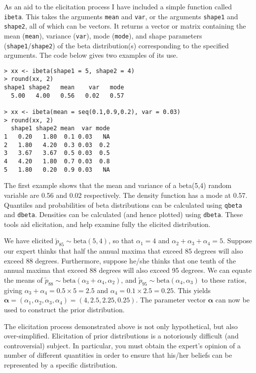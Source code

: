 \documentclass[11pt,a4paper]{article}
\newcommand{\bs}{\boldsymbol}
\begin{document}
As an aid to the elicitation process I have included a simple function called \verb+ibeta+.
This takes the arguments \verb+mean+ and \verb+var+, or the arguments \verb+shape1+ and \verb+shape2+, all of which can be vectors.
It returns a vector or matrix containing the mean (\verb+mean+), variance (\verb+var+), mode (\verb+mode+), and shape parameters (\verb+shape1+/\verb+shape2+) of the beta distribution(s) corresponding to the specified arguments.
The code below gives two examples of its use.

\begin{verbatim}
> xx <- ibeta(shape1 = 5, shape2 = 4)
> round(xx, 2)
shape1 shape2   mean    var   mode 
  5.00   4.00   0.56   0.02   0.57 

> xx <- ibeta(mean = seq(0.1,0.9,0.2), var = 0.03)
> round(xx, 2)
  shape1 shape2 mean  var mode
1   0.20   1.80  0.1 0.03   NA
2   1.80   4.20  0.3 0.03  0.2
3   3.67   3.67  0.5 0.03  0.5
4   4.20   1.80  0.7 0.03  0.8
5   1.80   0.20  0.9 0.03   NA
\end{verbatim}

The first example shows that the mean and variance of a beta(5,4) random variable are 0.56 and 0.02 respectively.
The density function has a mode at 0.57.
Quantiles and probabilities of beta distributions can be calculated using \verb+qbeta+ and \verb+dbeta+.
Densities can be calculated (and hence plotted) using \verb+dbeta+.
These tools aid elicitation, and help examine fully the elicited distribution.

We have elicited $\tilde{p}_{85} \sim \text{beta}(5,4)$, so that $\alpha_1 = 4$ and $\alpha_2+\alpha_3+\alpha_4 = 5$.
Suppose our expert thinks that half the annual maxima that exceed 85 degrees will also exceed 88 degrees.
Furthermore, suppose he/she thinks that one tenth of the annual maxima that exceed 88 degrees will also exceed 95 degrees.
We can equate the means of $\tilde{p}_{88} \sim \text{beta}(\alpha_3 + \alpha_4,\alpha_2)$, and $\tilde{p}_{95} \sim \text{beta}(\alpha_4,\alpha_3)$ to these ratios, giving $\alpha_3+\alpha_4 = 0.5\times5 = 2.5$ and $\alpha_4 = 0.1\times2.5 = 0.25$.
This yields $\bs{\alpha} = (\alpha_1,\alpha_2,\alpha_3,\alpha_4) = (4,2.5,2.25,0.25)$. 
The parameter vector $\bs{\alpha}$ can now be used to construct the prior distribution.

The elicitation process demonstrated above is not only hypothetical, but also over-simplified.
Elicitation of prior distributions is a notoriously difficult (and controversial) subject.
In particular, you must obtain the expert's opinion of a number of different quantities in order to ensure that his/her beliefs can be represented by a specific distribution. 
\end{document}

